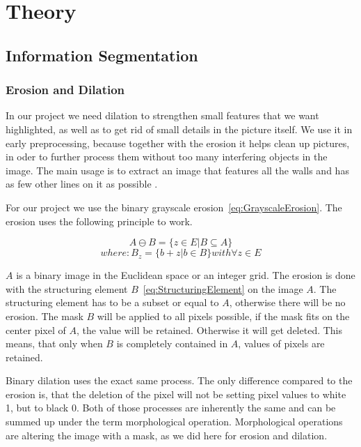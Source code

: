 \section{Theory}
\subsection{Information Segmentation}
\subsubsection{Erosion and Dilation}
\label{subsubsec:Erosion and Dilation}
In our project we need dilation to strengthen small features that we want highlighted, as well as to get rid of small details in the picture itself. We use it in early preprocessing, because together with the erosion it helps clean up pictures, in oder to further process them without too many interfering objects in the image. The main usage is to extract an image that features all the walls and has as few other lines on it as possible \citep{burger_burge_2016}.

For our project we use the binary grayscale erosion~\eqref{eq:GrayscaleErosion}.
The erosion uses the following principle to work.


\begin{equation}\label{eq:GrayscaleErosion}A \ominus B = \{ z\in E | B \subseteq A \}\end{equation}  
\begin{equation}\label{eq:StructuringElement}where: B_{z} = \{b+z | b \in B\} with \forall z \in E \end{equation}

$A$ is a binary image in the Euclidean space or an integer grid. The erosion is done with the structuring element $B$~\eqref{eq:StructuringElement} on the image $A$. The structuring element has to be a subset or equal to $A$, otherwise there will be no erosion. The mask $B$ will be applied to all pixels possible, if the mask fits on the center pixel of $A$, the value will be retained. Otherwise it will get deleted. This means, that only when $B$ is completely contained in $A$, values of pixels are retained.

Binary dilation uses the exact same process. The only difference compared to the erosion is, that the deletion of the pixel will not be setting pixel values to white 1, but to black 0. Both of those processes are inherently the same and can be summed up under the term morphological operation. Morphological operations are altering the image with a mask, as we did here for erosion and dilation.

